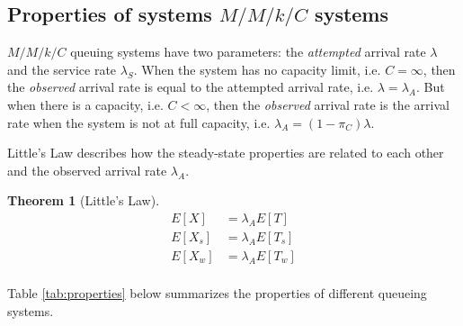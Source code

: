 \documentclass{article}
\newtheorem{theorem}{Theorem}
\begin{document}
\subsection{Properties of systems $M/M/k/C$ systems}

$M/M/k/C$ queuing systems have two parameters: the \emph{attempted} arrival rate
$\lambda$ and the service rate $\lambda_S$. When the system has no capacity 
limit, i.e. $C=\infty$, then the \emph{observed} arrival rate is equal to the 
attempted arrival rate, i.e. $\lambda=\lambda_A$. But when there is a capacity,
i.e. $C<\infty$, then the \emph{observed} arrival rate is the arrival rate when
the system is not at full capacity, i.e. $\lambda_A=(1-\pi_C)\lambda$. 

Little's Law describes how the steady-state properties are related to each other
and the observed arrival rate $\lambda_A$. 
\begin{theorem}[Little's Law]
\[ \begin{array}{rl}
E[X] &= \lambda_A E[T] \\
E[X_s] &= \lambda_A E[T_s] \\
E[X_w] &= \lambda_A E[T_w] \\
\end{array} \]
\end{theorem}


Table \ref{tab:properties} below summarizes the properties of different queueing
systems.

\newpage
\end{document}
